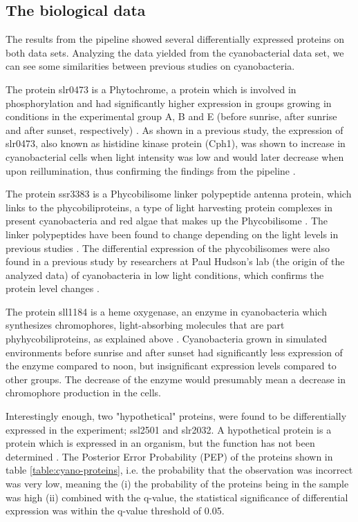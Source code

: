 \subsection{The biological data}
The results from the pipeline showed several differentially expressed proteins on both data sets. Analyzing the data yielded from the cyanobacterial data set, we can see some similarities between previous studies on cyanobacteria.

The protein slr0473 is a Phytochrome, a protein which is involved in phosphorylation and had significantly higher expression in groups growing in conditions in the experimental group A, B and E (before sunrise, after sunrise and after sunset, respectively) \cite{phytochrome}. As shown in a previous study, the expression of slr0473, also known as histidine kinase protein (Cph1), was shown to increase in cyanobacterial cells when light intensity was low and would later decrease when upon reillumination, thus confirming the findings from the pipeline \cite{phytochrome-dark}.

The protein ssr3383 is a Phycobilisome linker polypeptide antenna protein, which links to the phycobiliproteins, a type of light harvesting protein complexes in present cyanobacteria and red algae that makes up the Phycobilisome \cite{phycobilisomes}. The linker polypeptides have been found to change depending on the light levels in previous studies \cite{cyano-low-light}. The differential expression of the phycobilisomes were also found in a previous study by researchers at Paul Hudson's lab (the origin of the analyzed data) of cyanobacteria in low light conditions, which confirms the protein level changes \cite{michael-jahn-cyano}.

The protein sll1184 is a heme oxygenase, an enzyme in cyanobacteria which synthesizes chromophores, light-absorbing molecules that are part phyhycobiliproteins, as explained above \cite{heme-oxygenase} \cite{heme-oxygenase-2}. Cyanobacteria grown in simulated environments before sunrise and after sunset had significantly less expression of the enzyme compared to noon, but insignificant expression levels compared to other groups. The decrease of the enzyme would presumably mean a decrease in chromophore production in the cells.

Interestingly enough, two "hypothetical" proteins, were found to be differentially expressed in the experiment; ssl2501 and slr2032. A hypothetical protein is a protein which is expressed in an organism, but the function has not been determined \cite{hypothetical-protein1}. The Posterior Error Probability (PEP) of the proteins shown in table \ref{table:cyano-proteins}, i.e. the probability that the observation was incorrect was very low, meaning the (i) the probability of the proteins being in the sample was high (ii) combined with the q-value, the statistical significance of differential expression was within the q-value threshold of 0.05.

